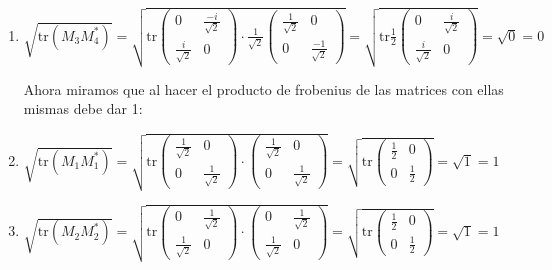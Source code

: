 \documentclass{report}
\begin{document}
\begin{enumerate}
\begin{enumerate}[label=\alph*)]
\begin{enumerate}
    
     
    \item  $\sqrt{\text{tr}(M_3 M_4^*)} = \sqrt{\text{tr} \begin{pmatrix}
    0 & \frac{-i}{\sqrt{2}}\\
    \frac{i}{\sqrt{2}} & 0
    \end{pmatrix} \cdot \frac{1}{\sqrt{2}}\begin{pmatrix}
    \frac{1}{\sqrt{2}} & 0\\
    0 & \frac{-1}{\sqrt{2}}
    \end{pmatrix}  }= \sqrt{\text{tr} \frac{1}{2} \begin{pmatrix}
    0 & \frac{i}{\sqrt{2}}\\
    \frac{i}{\sqrt{2}} & 0
    \end{pmatrix} } = \sqrt{0} = 0 $
    
    
    Ahora miramos que al hacer el producto de frobenius de las matrices con ellas mismas debe dar 1:
    
    
    
     
    \item $ \sqrt{\text{tr}(M_1 M_1^*)} =\sqrt{\text{tr} \begin{pmatrix}
    \frac{1}{\sqrt{2}}& 0\\
    0 & \frac{1}{\sqrt{2}}
    \end{pmatrix} \cdot \begin{pmatrix}
    \frac{1}{\sqrt{2}} & 0\\
    0 & \frac{1}{\sqrt{2}}
    \end{pmatrix}}= \sqrt{\text{tr} \begin{pmatrix}
    \frac{1}{2} & 0 \\
    0 & \frac{1}{2}
    \end{pmatrix}} = \sqrt{1} = 1$
    
    
    \item $ \sqrt{\text{tr}(M_2 M_2^*)} =\sqrt{\text{tr} \begin{pmatrix}
    0& \frac{1}{\sqrt{2}}\\
    \frac{1}{\sqrt{2}} & 0
    \end{pmatrix} \cdot \begin{pmatrix}
    0& \frac{1}{\sqrt{2}}\\
    \frac{1}{\sqrt{2}} & 0
    \end{pmatrix}}= \sqrt{\text{tr} \begin{pmatrix}
    \frac{1}{2} & 0 \\
    0 & \frac{1}{2}
    \end{pmatrix}} = \sqrt{1} = 1$ 
    

\end{enumerate}
\end{enumerate}
\end{enumerate}
\end{document}
